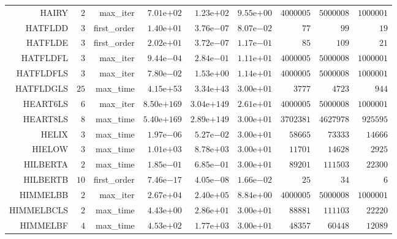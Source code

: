 \begin{longtable}{rrrrrrrrr}
HAIRY & \(     2\) & max\_iter & \( 7.01\)e\(+02\) & \( 1.23\)e\(+02\) & \( 9.55\)e\(+00\) & \(4000005\) & \(5000008\) & \(1000001\) \\
HATFLDD & \(     3\) & first\_order & \( 1.40\)e\(+01\) & \( 3.76\)e\(-07\) & \( 8.07\)e\(-02\) & \(    77\) & \(    99\) & \(    19\) \\
HATFLDE & \(     3\) & first\_order & \( 2.02\)e\(+01\) & \( 3.72\)e\(-07\) & \( 1.17\)e\(-01\) & \(    85\) & \(   109\) & \(    21\) \\
HATFLDFL & \(     3\) & max\_iter & \( 9.44\)e\(-04\) & \( 2.84\)e\(-01\) & \( 1.11\)e\(+01\) & \(4000005\) & \(5000008\) & \(1000001\) \\
HATFLDFLS & \(     3\) & max\_iter & \( 7.80\)e\(-02\) & \( 1.53\)e\(+00\) & \( 1.14\)e\(+01\) & \(4000005\) & \(5000008\) & \(1000001\) \\
HATFLDGLS & \(    25\) & max\_time & \( 4.15\)e\(+53\) & \( 3.34\)e\(+43\) & \( 3.00\)e\(+01\) & \(  3777\) & \(  4723\) & \(   944\) \\
HEART6LS & \(     6\) & max\_iter & \(8.50\)e\(+169\) & \(3.04\)e\(+149\) & \( 2.61\)e\(+01\) & \(4000005\) & \(5000008\) & \(1000001\) \\
HEART8LS & \(     8\) & max\_time & \(5.40\)e\(+169\) & \(2.89\)e\(+149\) & \( 3.00\)e\(+01\) & \(3702381\) & \(4627978\) & \(925595\) \\
HELIX & \(     3\) & max\_time & \( 1.97\)e\(-06\) & \( 5.27\)e\(-02\) & \( 3.00\)e\(+01\) & \( 58665\) & \( 73333\) & \( 14666\) \\
HIELOW & \(     3\) & max\_time & \( 1.01\)e\(+03\) & \( 8.78\)e\(+03\) & \( 3.00\)e\(+01\) & \( 11701\) & \( 14628\) & \(  2925\) \\
HILBERTA & \(     2\) & max\_time & \( 1.85\)e\(-01\) & \( 6.85\)e\(-01\) & \( 3.00\)e\(+01\) & \( 89201\) & \(111503\) & \( 22300\) \\
HILBERTB & \(    10\) & first\_order & \( 7.46\)e\(-17\) & \( 4.05\)e\(-08\) & \( 1.66\)e\(-02\) & \(    25\) & \(    34\) & \(     6\) \\
HIMMELBB & \(     2\) & max\_iter & \( 2.67\)e\(+04\) & \( 2.40\)e\(+05\) & \( 8.84\)e\(+00\) & \(4000005\) & \(5000008\) & \(1000001\) \\
HIMMELBCLS & \(     2\) & max\_time & \( 4.43\)e\(+00\) & \( 2.86\)e\(+01\) & \( 3.00\)e\(+01\) & \( 88881\) & \(111103\) & \( 22220\) \\
HIMMELBF & \(     4\) & max\_time & \( 4.53\)e\(+02\) & \( 1.77\)e\(+03\) & \( 3.00\)e\(+01\) & \( 48357\) & \( 60448\) & \( 12089\) \\

\end{longtable}
